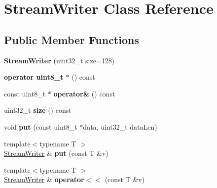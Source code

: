 \hypertarget{classStreamWriter}{\section{Stream\-Writer Class Reference}
\label{classStreamWriter}
}
\subsection*{Public Member Functions}
\begin{DoxyCompactItemize}
\item 
\hypertarget{classStreamWriter_a84ccbe3b1c499aa9e7f6d1e28a7e2891}{{\bfseries Stream\-Writer} (uint32\-\_\-t size=128)}\label{classStreamWriter_a84ccbe3b1c499aa9e7f6d1e28a7e2891}

\item 
\hypertarget{classStreamWriter_ae006d5a2b37f7ce23af82a9cf254d5b9}{{\bfseries operator uint8\-\_\-t $\ast$} () const }\label{classStreamWriter_ae006d5a2b37f7ce23af82a9cf254d5b9}

\item 
\hypertarget{classStreamWriter_a3ebc19b3288010d7792e9cbeb679787c}{const uint8\-\_\-t $\ast$ {\bfseries operator\&} () const }\label{classStreamWriter_a3ebc19b3288010d7792e9cbeb679787c}

\item 
\hypertarget{classStreamWriter_a38378cc06e7e59e3b75d7ff0a8ab0002}{uint32\-\_\-t {\bfseries size} () const }\label{classStreamWriter_a38378cc06e7e59e3b75d7ff0a8ab0002}

\item 
\hypertarget{classStreamWriter_ac2b70557cbbe52264c22164fce05d633}{void {\bfseries put} (const uint8\-\_\-t $\ast$data, uint32\-\_\-t data\-Len)}\label{classStreamWriter_ac2b70557cbbe52264c22164fce05d633}

\item 
\hypertarget{classStreamWriter_a8d197b9f5886618f7c068c41a5f0d817}{{\footnotesize template$<$typename T $>$ }\\\hyperlink{classStreamWriter}{Stream\-Writer} \& {\bfseries put} (const T \&v)}\label{classStreamWriter_a8d197b9f5886618f7c068c41a5f0d817}

\item 
\hypertarget{classStreamWriter_a2f281d656c46367f0fecd3af13709cc9}{{\footnotesize template$<$typename T $>$ }\\\hyperlink{classStreamWriter}{Stream\-Writer} \& {\bfseries operator$<$$<$} (const T \&v)}\label{classStreamWriter_a2f281d656c46367f0fecd3af13709cc9}


\end{DoxyCompactItemize}
